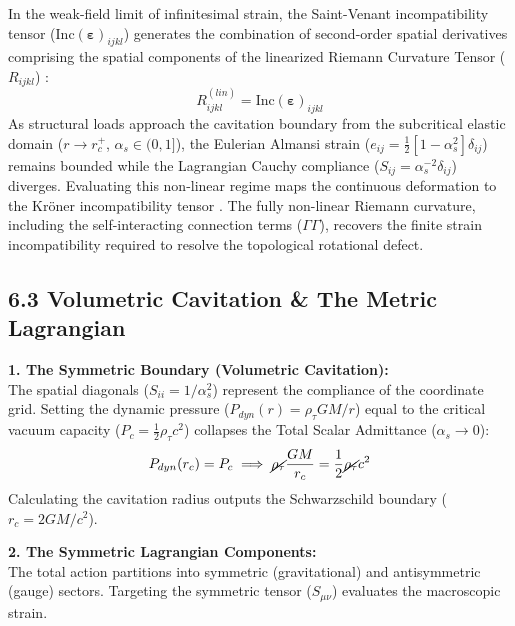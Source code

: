 In the weak-field limit of infinitesimal strain, the Saint-Venant incompatibility tensor ($\text{Inc}(\boldsymbol{\varepsilon})_{ijkl}$) generates the combination of second-order spatial derivatives comprising the spatial components of the linearized Riemann Curvature Tensor ($R_{ijkl}$) \cite{Kroner1958}:  
\begin{equation} 
    R_{ijkl}^{(lin)} = \text{Inc}(\boldsymbol{\varepsilon})_{ijkl} 
\end{equation}
As structural loads approach the cavitation boundary from the subcritical elastic domain ($r \to r_c^+$, $\alpha_s \in (0, 1]$), the Eulerian Almansi strain ($e_{ij} = \frac{1}{2}[1 - \alpha_s^2]\delta_{ij}$) remains bounded while the Lagrangian Cauchy compliance ($S_{ij} = \alpha_s^{-2}\delta_{ij}$) diverges. Evaluating this non-linear regime maps the continuous deformation to the Kröner incompatibility tensor \cite{Kroner1958}. The fully non-linear Riemann curvature, including the self-interacting connection terms ($\Gamma \Gamma$), recovers the finite strain incompatibility required to resolve the topological rotational defect. %

\subsection*{6.3 Volumetric Cavitation \& The Metric Lagrangian}

\textbf{1. The Symmetric Boundary (Volumetric Cavitation):} \\
The spatial diagonals ($S_{ii} = 1/\alpha_s^2$) represent the compliance of the coordinate grid. Setting the dynamic pressure ($P_{dyn}(r) = \rho_\tau GM/r$) equal to the critical vacuum capacity ($P_c = \frac{1}{2}\rho_\tau c^2$) collapses the Total Scalar Admittance ($\alpha_s \to 0$): 
\begin{equation}
    P_{dyn}(r_c) = P_c \implies \cancel{\rho_\tau} \frac{GM}{r_c} = \frac{1}{2}\cancel{\rho_\tau} c^2 
\end{equation}
Calculating the cavitation radius outputs the Schwarzschild boundary ($r_c = 2GM/c^2$). 

\vspace{0.2 cm}

\textbf{2. The Symmetric Lagrangian Components:} \\
The total action partitions into symmetric (gravitational) and antisymmetric (gauge) sectors. Targeting the symmetric tensor ($S_{\mu\nu}$) evaluates the macroscopic strain.

